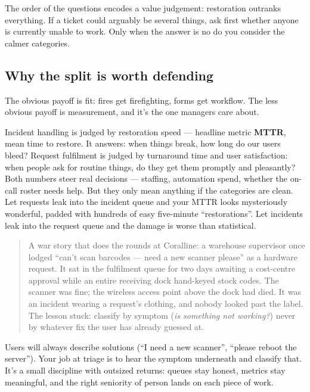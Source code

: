 The order of the questions encodes a value judgement: restoration outranks everything. If a ticket could arguably be several things, ask first whether anyone is currently unable to work. Only when the answer is no do you consider the calmer categories.



\subsection{Why the split is worth defending}


The obvious payoff is fit: fires get firefighting, forms get workflow. The less obvious payoff is measurement, and it's the one managers care about.


Incident handling is judged by restoration speed — headline metric \textbf{MTTR}, mean time to restore. It answers: when things break, how long do our users bleed? Request fulfilment is judged by turnaround time and user satisfaction: when people ask for routine things, do they get them promptly and pleasantly? Both numbers steer real decisions — staffing, automation spend, whether the on-call roster needs help. But they only mean anything if the categories are clean. Let requests leak into the incident queue and your MTTR looks mysteriously wonderful, padded with hundreds of easy five-minute ``restorations''. Let incidents leak into the request queue and the damage is worse than statistical.



\begin{quote}\small
A war story that does the rounds at Coralline: a warehouse supervisor once lodged ``can't scan barcodes — need a new scanner please'' as a hardware request. It sat in the fulfilment queue for two days awaiting a cost-centre approval while an entire receiving dock hand-keyed stock codes. The scanner was fine; the wireless access point above the dock had died. It was an incident wearing a request's clothing, and nobody looked past the label. The lesson stuck: classify by symptom (\emph{is something not working?}) never by whatever fix the user has already guessed at.
\end{quote}


Users will always describe solutions (``I need a new scanner'', ``please reboot the server''). Your job at triage is to hear the symptom underneath and classify that. It's a small discipline with outsized returns: queues stay honest, metrics stay meaningful, and the right seniority of person lands on each piece of work.


